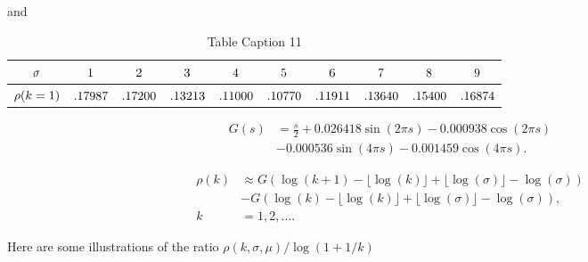 \documentclass[titlepage,fleqn]{article}%
\begin{document}
\bigskip

\noindent and%

\begin{table}[!htbp] \centering
\begin{tabular}
[c]{|c|c|c|c|c|c|c|c|c|c|}\hline\hline
${\small \sigma}$ & ${\small 1}$ & ${\small 2}$ & ${\small 3}$ & ${\small 4}$
& ${\small 5}$ & ${\small 6}$ & ${\small 7}$ & ${\small 8}$ & ${\small 9}%
$\\\hline
${\small \rho(k=1)}$ & ${\small .17987}$ & ${\small .17200}$ &
${\small .13213}$ & ${\small .11000}$ & ${\small .10770}$ & ${\small .11911}$
& ${\small .13640}$ & ${\small .15400}$ & ${\small .16874}$\\\hline\hline
\end{tabular}
\caption{Table Caption 11}\label{TableKey11}%
\end{table}%
\bigskip%
\begin{align*}
G(s)  &  =\frac{s}{2}+0.026418\sin(2\pi s)-0.000938\cos(2\pi s)\\
&  -0.000536\sin(4\pi s)-0.001459\cos(4\pi s).
\end{align*}
%

\begin{align*}
\rho(k)  &  \approx G(\log(k+1)-\lfloor\log(k)\rfloor+\lfloor\log
(\sigma)\rfloor-\log(\sigma))\\
&  -G(\log(k)-\lfloor\log(k)\rfloor+\lfloor\log(\sigma)\rfloor-\log
(\sigma)),\\
k  &  =1,2,\ldots.
\end{align*}


\bigskip Here are some illustrations of the ratio $\rho(k,\sigma,\mu
)/\log(1+1/k)$%
\end{document}
